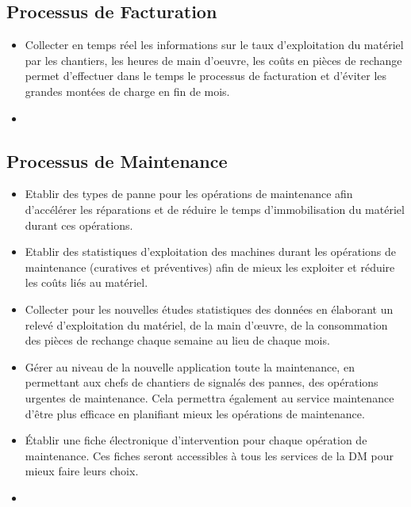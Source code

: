         \subsection{Processus de Facturation}
        \begin{itemize}
                \item Collecter en temps réel les informations sur le taux d'exploitation du matériel par les chantiers, les heures de main d'oeuvre, les coûts en pièces de rechange permet d'effectuer dans le temps le processus de facturation et d'éviter les grandes montées de charge en fin de mois.
                \item 
        \end{itemize}

        \subsection{Processus de Maintenance}
        \begin{itemize}
                \item Etablir des types de panne pour les opérations de maintenance afin d'accélérer les réparations et de réduire le temps d'immobilisation du matériel durant ces opérations.
                \item Etablir des statistiques d'exploitation des machines durant les opérations de maintenance (curatives et préventives) afin de mieux les exploiter et réduire les coûts liés au matériel.
                \item Collecter pour les nouvelles études statistiques des données en élaborant un relevé d'exploitation du matériel, de la main d'œuvre, de la consommation des pièces de rechange chaque semaine au lieu de chaque mois.
                \item Gérer au niveau de la nouvelle application toute la maintenance, en permettant aux chefs de chantiers de signalés des pannes, des opérations urgentes de maintenance. Cela permettra également au service maintenance d'être plus efficace en planifiant mieux les opérations de maintenance.
                \item Établir une fiche électronique d'intervention pour chaque opération de maintenance. Ces fiches seront accessibles à tous les services de la DM pour mieux faire leurs choix.
                \item 
        \end{itemize}

